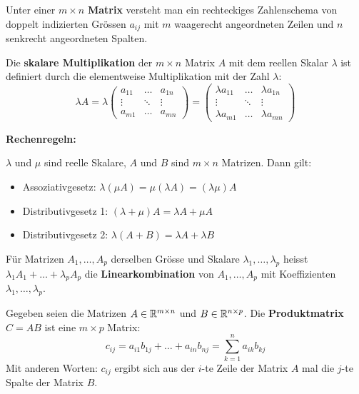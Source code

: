 

Unter einer $m \times n$ \textbf{Matrix} versteht man ein rechteckiges Zahlenschema von doppelt indizierten Grössen $a_{ij}$ mit $m$ waagerecht angeordneten Zeilen und $n$ senkrecht angeordneten Spalten.



Die \textbf{skalare Multiplikation} der $m \times n$ Matrix $A$ mit dem reellen Skalar $\lambda$ ist definiert durch die elementweise Multiplikation mit der Zahl $\lambda$:
\[\lambda A = \lambda \left(
\begin{array}{ccc}
    a_{11} & \ldots & a_{1n} \\
    \vdots & \ddots & \vdots \\
    a_{m1} & \ldots & a_{mn}
\end{array}
\right) = \left(
\begin{array}{ccc}
    \lambda a_{11} & \ldots & \lambda a_{1n} \\
    \vdots         & \ddots & \vdots         \\
    \lambda a_{m1} & \ldots & \lambda a_{mn}
\end{array}
\right)\]

\textbf{Rechenregeln:}

$\lambda$ und $\mu$ sind reelle Skalare, $A$ und $B$ sind $m \times n$ Matrizen.
Dann gilt:
\begin{itemize}
    \item Assoziativgesetz: $\lambda (\mu A) = \mu (\lambda A) = (\lambda \mu) A$
    \item Distributivgesetz 1: $(\lambda + \mu) A = \lambda A + \mu A$
    \item Distributivgesetz 2: $\lambda (A + B) = \lambda A + \lambda B$
\end{itemize}

Für Matrizen $A_1, \dots, A_p$ derselben Grösse und Skalare $\lambda_1, \dots, \lambda_p$ heisst $\lambda_1 A_1 + \dots + \lambda_p A_p$ die \textbf{Linearkombination} von $A_1, \dots, A_p$ mit Koeffizienten $\lambda_1, \dots, \lambda_p$.


Gegeben seien die Matrizen $A \in \mathbb{R}^{m \times n}$ und $B \in \mathbb{R}^{n \times p}$.
Die \textbf{Produktmatrix} $C = AB$ ist eine $m \times p$ Matrix:
\[c_{ij} = a_{i1} b_{1j} + \dots + a_{in} b_{nj} = \sum_{k=1}^{n} a_{ik} b_{kj}\]
Mit anderen Worten: $c_{ij}$ ergibt sich aus der $i$-te Zeile der Matrix $A$ mal die $j$-te Spalte der Matrix $B$.

